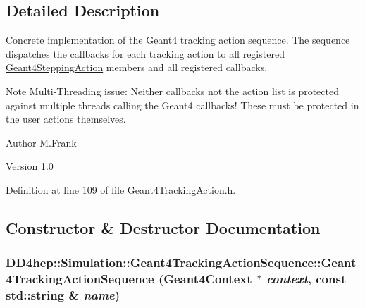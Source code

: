 \subsection{Detailed Description}
Concrete implementation of the Geant4 tracking action sequence. The sequence dispatches the callbacks for each tracking action to all registered \hyperlink{class_d_d4hep_1_1_simulation_1_1_geant4_stepping_action}{Geant4SteppingAction} members and all registered callbacks.

Note Multi-\/Threading issue: Neither callbacks not the action list is protected against multiple threads calling the Geant4 callbacks! These must be protected in the user actions themselves.

\begin{DoxyAuthor}{Author}
M.Frank 
\end{DoxyAuthor}
\begin{DoxyVersion}{Version}
1.0 
\end{DoxyVersion}


Definition at line 109 of file Geant4TrackingAction.h.

\subsection{Constructor \& Destructor Documentation}
\hypertarget{class_d_d4hep_1_1_simulation_1_1_geant4_tracking_action_sequence_a9a85821d29760004065623d505a8d50a}{
\subsubsection[{Geant4TrackingActionSequence}]{\setlength{\rightskip}{0pt plus 5cm}DD4hep::Simulation::Geant4TrackingActionSequence::Geant4TrackingActionSequence ({\bf Geant4Context} $\ast$ {\em context}, \/  const std::string \& {\em name})}}
\label{class_d_d4hep_1_1_simulation_1_1_geant4_tracking_action_sequence_a9a85821d29760004065623d505a8d50a}


